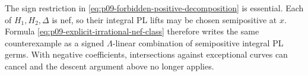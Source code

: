 \begin{remark}
\label{rem:p09-positive-coefficients-essential}
The sign restriction in
\eqref{eq:p09-forbidden-positive-decomposition} is essential.  Each of
\(H_1,H_2,\Delta\) is nef, so their integral PL lifts may be chosen
semipositive at \(x\).  Formula
\eqref{eq:p09-explicit-irrational-nef-class} therefore writes the same
counterexample as a signed \(\Lambda\)-linear combination of semipositive
integral PL germs.  With negative coefficients, intersections against
exceptional curves can cancel and the descent argument above no longer
applies.
\end{remark}
